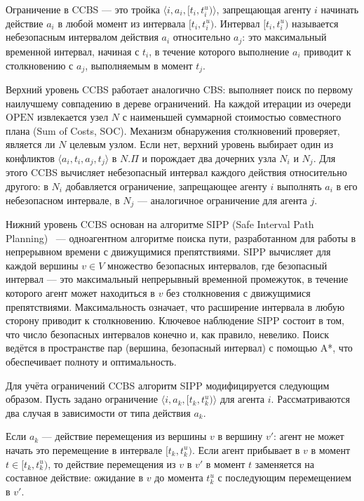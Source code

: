 Ограничение в CCBS --- это тройка $\langle i, a_i, [t_i, t_i^u) \rangle$, запрещающая агенту $i$
начинать действие $a_i$ в любой момент из интервала $[t_i, t_i^u)$. Интервал $[t_i, t_i^u)$
называется небезопасным интервалом действия $a_i$ относительно $a_j$: это максимальный временной
интервал, начиная с $t_i$, в течение которого выполнение $a_i$ приводит к столкновению с $a_j$,
выполняемым в момент $t_j$.

Верхний уровень CCBS работает аналогично CBS: выполняет поиск по первому наилучшему совпадению
в дереве ограничений. На каждой итерации из очереди $\mathrm{OPEN}$ извлекается узел $N$ с
наименьшей суммарной стоимостью совместного плана (Sum of Costs, SOC). Механизм обнаружения
столкновений проверяет, является ли $N$ целевым узлом. Если нет, верхний уровень выбирает один
из конфликтов $\langle a_i, t_i, a_j, t_j \rangle$ в $N.\Pi$ и порождает два дочерних узла $N_i$
и $N_j$. Для этого CCBS вычисляет небезопасный интервал каждого действия относительно другого:
в $N_i$ добавляется ограничение, запрещающее агенту $i$ выполнять $a_i$ в его небезопасном
интервале, в $N_j$ --- аналогичное ограничение для агента $j$.

Нижний уровень CCBS основан на алгоритме SIPP (Safe Interval Path Planning)~\cite{sipp} ---
одноагентном алгоритме поиска пути, разработанном для работы в непрерывном времени с движущимися
препятствиями. SIPP вычисляет для каждой вершины $v \in V$ множество безопасных интервалов, где
безопасный интервал --- это максимальный непрерывный временной промежуток, в течение которого агент
может находиться в $v$ без столкновения с движущимися препятствиями. Максимальность означает, что
расширение интервала в любую сторону приводит к столкновению. Ключевое наблюдение SIPP состоит в
том, что число безопасных интервалов конечно и, как правило, невелико. Поиск ведётся в пространстве
пар (вершина, безопасный интервал) с помощью A*, что обеспечивает полноту и оптимальность.

Для учёта ограничений CCBS алгоритм SIPP модифицируется следующим образом. Пусть задано ограничение
$\langle i, a_k, [t_k, t_k^u) \rangle$ для агента $i$. Рассматриваются два случая в зависимости
от типа действия $a_k$.

Если $a_k$ --- действие перемещения из вершины $v$ в вершину $v'$: агент не может начать это
перемещение в интервале $[t_k, t_k^u)$. Если агент прибывает в $v$ в момент $t \in [t_k, t_k^u)$,
то действие перемещения из $v$ в $v'$ в момент $t$ заменяется на составное действие: ожидание в $v$
до момента $t_k^u$ с последующим перемещением в $v'$.

